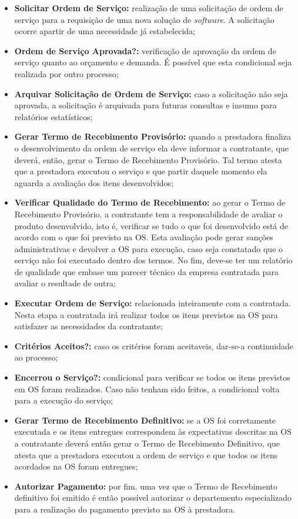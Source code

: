 \begin{itemize}
  \item \textbf{Solicitar Ordem de Serviço:} realização de uma solicitação de ordem
  de serviço para a requisição de uma nova solução de \textit{software}. A solicitação
  ocorre apartir de uma necessidade já estabelecida;
  \item \textbf{Ordem de Serviço Aprovada?:} verificação de aprovação da ordem de
  serviço quanto ao orçamento e demanda. É possível que esta condicional seja realizada
  por outro processo;
  \item \textbf{Arquivar Solicitação de Ordem de Serviço:} caso a solicitação não seja
  aprovada, a solicitação é arquivada para futuras consultas e insumo para relatórios
  estatísticos;
  \item \textbf{Gerar Termo de Recebimento Provisório:} quando a prestadora
  finaliza o desenvolvimento da ordem de serviço ela deve informar a contratante,
  que deverá, então, gerar o Termo de Recebimento Provisório. Tal termo atesta
  que a prestadora executou o serviço e que partir daquele momento ela aguarda
  a avaliação dos itens desenvolvidos;
  \item \textbf{Verificar Qualidade do Termo de Recebimento:} ao gerar o Termo de Recebimento Provisório,
  a contratante tem a responsabilidade de avaliar o produto desenvolvido, isto é,
  verificar se tudo o que foi desenvolvido está de acordo com o que foi previsto
  na OS. Esta avaliação pode gerar sanções administrativas e devolver a OS para
  execução, caso seja constatado que o serviço não foi executado dentro dos termos.
  No fim, deve-se ter um relatório de qualidade que embase um parecer técnico da
  empresa contratada para avaliar o resultade de outra;
  \item \textbf{Executar Ordem de Serviço:} relacionada inteiramente com a contratada.
  Nesta etapa a contratada irá realizar todos os itens previstos na OS para satisfazer
  as necessidades da contratante;
  \item \textbf{Critérios Aceitos?:} caso os critérios foram aceitaveis, dar-se-a 
  continuidade ao processo;
  \item \textbf{Encerrou o Serviço?:} condicional para verificar se todos os itens
  previstos em OS foram realizados. Caso não tenham sido feitos, a condicional volta
  para a execução do serviço;
  \item \textbf{Gerar Termo de Recebimento Definitivo:} se a OS foi corretamente
  executada e os itens entregues correspondem às expectativas descritas na
  OS a contratante deverá então gerar o Termo de Recebimento Definitivo, que
  atesta que a prestadora executou a ordem de serviço e que todos os itens
  acordados na OS foram entregues;
  \item \textbf{Autorizar Pagamento:} por fim, uma vez que o Termo de Recebimento
  definitivo foi emitido é então possível autorizar o departemento especializado para
  a realização do pagamento previsto na OS à prestadora.
\end{itemize}

